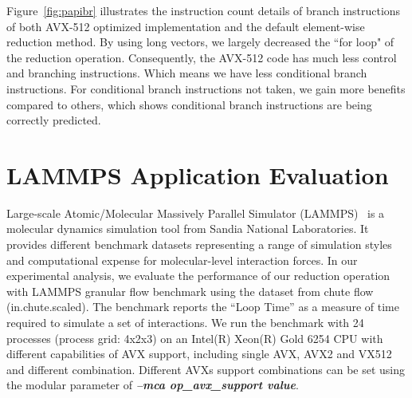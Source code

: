 \documentclass[5p,times,twocolumn]{elsarticle}
\begin{document}
Figure~\ref{fig:papibr} illustrates the instruction count details
of branch instructions of both AVX-512 optimized implementation and the default
element-wise reduction method. By using long vectors, we largely decreased the ``for loop" of the reduction
operation. Consequently, the AVX-512 code has much less control and branching instructions.
Which means we have less conditional branch instructions.
For conditional branch instructions not taken, we gain
more benefits compared to others, which shows conditional branch instructions are being correctly predicted.


\section{LAMMPS Application Evaluation}\label{sec:hpcapplication}
Large-scale Atomic/Molecular Massively Parallel Simulator (LAMMPS)~\cite{PLIMPTON19951} is a
molecular dynamics simulation tool from Sandia National Laboratories.
It provides different benchmark datasets representing a range of simulation styles
and computational expense for molecular-level interaction forces.
In our experimental analysis, we evaluate the performance of our reduction
operation with LAMMPS granular flow benchmark
using the dataset from chute flow (in.chute.scaled).
The benchmark reports the “Loop Time” as a measure of
time required to simulate a set of interactions.
We run the benchmark with 24 processes (process
grid: 4x2x3) on an Intel(R) Xeon(R) Gold 6254 CPU with different
capabilities of AVX support, including single AVX, AVX2 and VX512
and different combination. Different AVXs support combinations can be set using
the modular parameter of \emph{\textbf{\textit{--mca op_avx_support value}}}.
\end{document}
